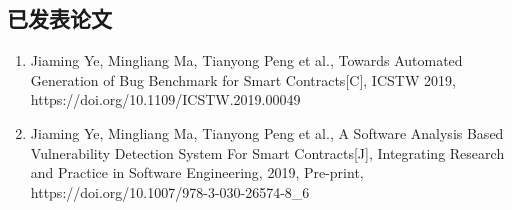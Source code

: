 
\begin{publications}

\section*{已发表论文}

\begin{enumerate}
\item Jiaming Ye, Mingliang Ma, Tianyong Peng et al., Towards Automated Generation of Bug Benchmark for Smart Contracts[C], ICSTW 2019, https://doi.org/10.1109/ICSTW.2019.00049 
\item Jiaming Ye, Mingliang Ma, Tianyong Peng et al., A Software Analysis Based Vulnerability Detection System For Smart Contracts[J], Integrating Research and Practice in Software Engineering, 2019, Pre-print, https://doi.org/10.1007/978-3-030-26574-8\_6
\end{enumerate}

\end{publications}
